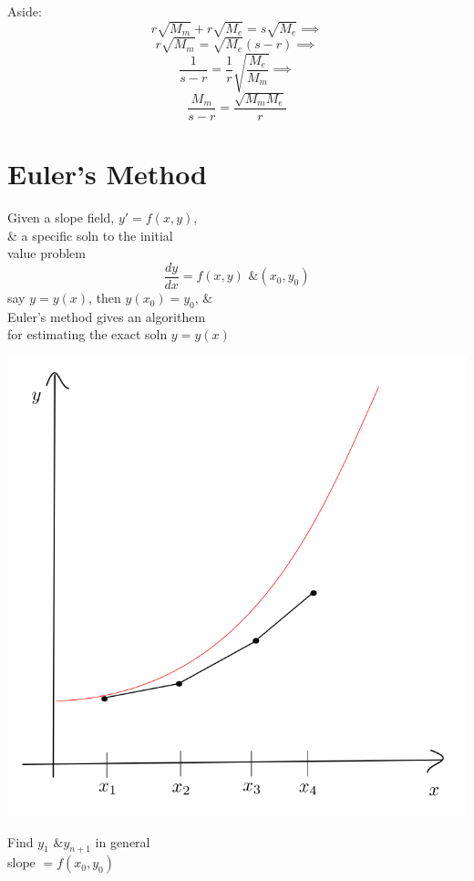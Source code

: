 \documentclass[10pt,a4paper]{article}
\theoremstyle{definition}
\begin{document}
  Aside:
  \[ r \sqrt{M_m}+ r \sqrt{M_e} = s \sqrt{M_e} \implies \]
  \[ r \sqrt{M_m} = \sqrt{M_e}(s-r) \implies \]
  \[ \frac{1}{s-r} = \frac{1}{r} \sqrt{ \frac{M_e}{M_m}} \implies \]
  \[ \frac{M_m}{s-r} = \frac{\sqrt{M_mM_e}}{r} \]

\section*{ Euler's Method}
  Given a slope field, \( y' = f(x, y) \), \\
  \& a specific soln to the initial \\
  value problem 
  \[ \frac{dy}{dx} = f(x, y) \text{ \& } (x_0, y_0) \]
  say \( y = y(x) \), then \( y(x_0) = y_0 \), \& \\
  Euler's method gives an algorithem \\
  for estimating the exact soln \( y = y(x) \) %
  \begin{flushleft}
    \includegraphics[scale=.3]{euler1}
  \end{flushleft}
  Find \( y_1 \text{ \& } y_{n+1} \) in general \\
  slope \( = f(x_0, y_0) \) \\
\end{document}
